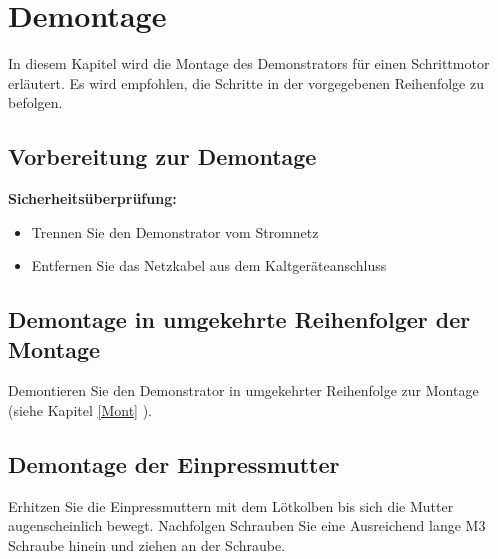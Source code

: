 %

\chapter{Demontage}
In diesem Kapitel wird die Montage des Demonstrators für einen Schrittmotor erläutert. Es wird empfohlen, die Schritte in der vorgegebenen Reihenfolge zu befolgen.


\section{ Vorbereitung zur Demontage}

\textbf{Sicherheitsüberprüfung:}\begin{itemize}
		\item Trennen Sie den Demonstrator vom Stromnetz 
		\item Entfernen Sie das Netzkabel aus dem Kaltgeräteanschluss
	\end{itemize}

\section{ Demontage in umgekehrte Reihenfolger der Montage}

Demontieren Sie den Demonstrator in umgekehrter Reihenfolge zur Montage (siehe Kapitel \ref{Mont} ).

\section{ Demontage der Einpressmutter}
Erhitzen Sie die Einpressmuttern mit dem Lötkolben bis sich die Mutter augenscheinlich bewegt. Nachfolgen Schrauben Sie eine Ausreichend lange M3 Schraube hinein und ziehen an der Schraube.

